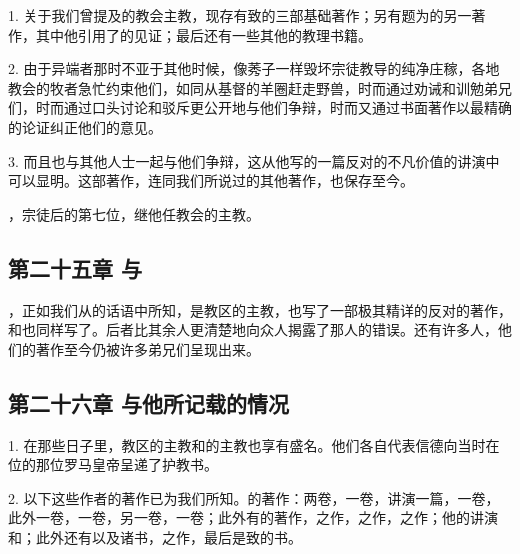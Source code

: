 1. 关于我们曾提及的教会主教，现存有致的三部基础著作；另有题为的另一著作，其中他引用了的见证；最后还有一些其他的教理书籍。\par

2. 由于异端者那时不亚于其他时候，像莠子一样毁坏宗徒教导的纯净庄稼，各地教会的牧者急忙约束他们，如同从基督的羊圈赶走野兽，时而通过劝诫和训勉弟兄们，时而通过口头讨论和驳斥更公开地与他们争辩，时而又通过书面著作以最精确的论证纠正他们的意见。\par

3. 而且也与其他人士一起与他们争辩，这从他写的一篇反对的不凡价值的讲演中可以显明。这部著作，连同我们所说过的其他著作，也保存至今。\par

，宗徒后的第七位，继他任教会的主教。\par


\subsection{第二十五章 与}

，正如我们从的话语中所知，是教区的主教，也写了一部极其精详的反对的著作，和也同样写了。后者比其余人更清楚地向众人揭露了那人的错误。还有许多人，他们的著作至今仍被许多弟兄们呈现出来。\par


\subsection{第二十六章 与他所记载的情况}

1. 在那些日子里，教区的主教和的主教也享有盛名。他们各自代表信德向当时在位的那位罗马皇帝呈递了护教书。\par

2. 以下这些作者的著作已为我们所知。的著作：两卷，一卷，讲演一篇，一卷，此外一卷，一卷，另一卷，一卷；此外有的著作，之作，之作，之作；他的讲演和；此外还有以及诸书，之作，最后是致的书。\par

